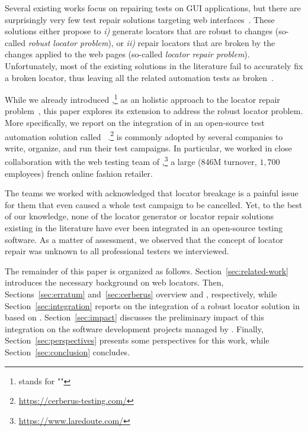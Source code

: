 \documentclass[10pt,conference]{IEEEtran}
\begin{document}
Several existing works focus on repairing tests on GUI applications, but there are surprisingly very few test repair solutions targeting web interfaces~\cite{imtiaz2019systematic}.
These solutions either propose to \emph{i)} generate locators that are robust to changes (so-called \emph{robust locator problem}), or \emph{ii)} repair locators that are broken by the changes applied to the web pages (so-called \emph{locator repair problem}).
Unfortunately, most of the existing solutions in the literature fail to accurately fix a broken locator, thus leaving all the related automation tests as broken~\cite{hammoudi2016record}.

While we already introduced \erratum{},\footnote{\erratum{} stands for "\erratumlong{}"} as an holistic approach to the locator repair problem~\cite{brisset2021erratum}, this paper explores its extension to address the robust locator problem.
More specifically, we report on the integration of \erratum{} in an open-source test automation solution called \cerberus{}~\cite{cerberus-icst20}.\footnote{\url{https://cerberus-testing.com/}}
\cerberus{} is commonly adopted by several companies to write, organize, and run their test campaigns.
In particular, we worked in close collaboration with the web testing team of \laredoute{},\footnote{\url{https://www.laredoute.com/}} a large (846M turnover, $1,700$ employees) french online fashion retailer.

The teams we worked with acknowledged that locator breakage is a painful issue for them that even caused a whole test campaign to be cancelled.
Yet, to the best of our knowledge, none of the locator generator or locator repair solutions existing in the literature have ever been integrated in an open-source testing software.
As a matter of assessment, we observed that the concept of locator repair was unknown to all professional testers we interviewed.


The remainder of this paper is organized as follows.
Section~\ref{sec:related-work} introduces the necessary background on web locators.
% 
Then, Sections~\ref{sec:erratum} and~\ref{sec:cerberus} overview \erratum and \cerberus, respectively, while Section~\ref{sec:integration} reports on the integration of a robust locator solution in \cerberus based on \erratum.
Section~\ref{sec:impact} discusses the preliminary impact of this integration on the software development projects managed by \laredoute.
% 
Finally, Section~\ref{sec:perspectives} presents some perspectives for this work, while Section~\ref{sec:conclusion} concludes.
\end{document}
